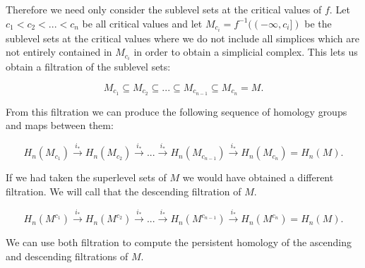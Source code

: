 Therefore we need only consider the sublevel sets at the critical values of $f$. Let $c_1 < c_2 < ... < c_n$ be all critical values and let $M_{c_i} = f^{-1}((-\infty, c_i])$ be the sublevel sets at the critical values where we do not include all simplices which are not entirely contained in $M_{c_i}$ in order to obtain a simplicial complex. This lets us obtain a filtration of the sublevel sets:

$$ M_{c_1} \subseteq M_{c_2} \subseteq ... \subseteq M_{c_{n-1}} \subseteq M_{c_n} = M.$$

From this filtration we can produce the following sequence of homology groups and maps between them:

$$ H_n(M_{c_1}) \overset{i_*}{\longrightarrow} H_n(M_{c_2}) \overset{i_*}{\longrightarrow} ... \overset{i_*}{\longrightarrow} H_n(M_{c_{n-1}}) \overset{i_*}{\longrightarrow} H_n(M_{c_n}) = H_n(M).$$

If we had taken the superlevel sets of $M$ we would have obtained a different filtration. We will call that the descending filtration of $M$.

$$ H_n(M^{c_1}) \overset{i_*}{\longrightarrow} H_n(M^{c _2}) \overset{i_*}{\longrightarrow} ... \overset{i_*}{\longrightarrow} H_n(M^{c_{n-1}}) \overset{i_*}{\longrightarrow} H_n(M^{c_n}) = H_n(M).$$

We can use both filtration to compute the persistent homology of the ascending and descending filtrations of $M$.


%


